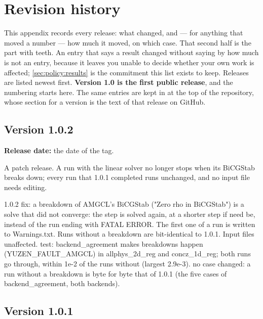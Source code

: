 \chapter{Revision history}
\label{ch:revisions}

This appendix records every release: what changed, and --- for anything that
moved a number --- how much it moved, on which case. That second half is the
part with teeth. An entry that says a result changed without saying by how much
is not an entry, because it leaves you unable to decide whether your own work
is affected; \cref{sec:policy:results} is the commitment this list exists to
keep. Releases are listed newest first. \textbf{Version 1.0 is the first
public release}, and the numbering starts here. The same entries are kept in
 at the top of the repository, whose section for a version
is the text of that release on GitHub.

\section{Version 1.0.2}
\label{sec:rev:1-0-2}

\textbf{Release date:} the date of the  tag.

A patch release. A run with the  linear solver no longer stops
when its BiCGStab breaks down; every run that 1.0.1 completed runs unchanged,
and no input file needs editing.

\begin{plain}
1.0.2
  fix: a breakdown of AMGCL's BiCGStab ("Zero rho in BiCGStab") is a
       solve that did not converge: the step is solved again, at a
       shorter step if need be, instead of the run ending with FATAL
       ERROR. The first one of a run is written to Warnings.txt. Runs
       without a breakdown are bit-identical to 1.0.1. Input files
       unaffected.
  test: backend_agreement makes breakdowns happen (YUZEN_FAULT_AMGCL) in
       allphys_2d_reg and concz_1d_reg; both runs go through, within
       1e-2 of the runs without (largest 2.9e-3).
  no case changed: a run without a breakdown is byte for byte that of
       1.0.1 (the five cases of backend_agreement, both backends).
\end{plain}

\section{Version 1.0.1}
\label{sec:rev:1-0-1}

